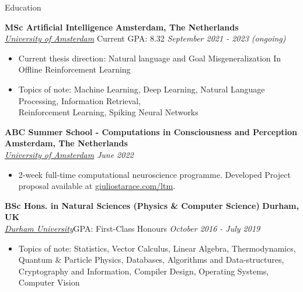 \documentclass{resume} %
\begin{document}
\begin{rSection}{Education}

	{\bf MSc Artificial Intelligence} \hfill \textbf{Amsterdam, The Netherlands}
	\\\href{https://www.dur.ac.uk/}{\textit{University of Amsterdam}} \hfill Current GPA: 8.32 \hfill {\em September 2021
		- 2023 (ongoing)}
	\begin{itemize}
		\item Current thesis direction: Natural language and Goal Misgeneralization In Offline
		      Reinforcement Learning
		\item Topics of note: Machine Learning, Deep Learning, Natural Language Processing, Information
		      Retrieval,\\ Reinforcement Learning, Spiking Neural Networks
	\end{itemize}

	{\bf ABC Summer School - Computations in Consciousness and Perception} \hfill \textbf{Amsterdam, The Netherlands}
	\\\href{https://www.dur.ac.uk/}{\textit{University of Amsterdam}} \hfill {\em June 2022}
	\begin{itemize}
		\item 2-week full-time computational neuroscience programme. Developed Project proposal
		      available at \href{https://www.giuliostarace.com/ltm/}{giuliostarace.com/ltm}.
	\end{itemize}

	{\bf BSc Hons. in Natural Sciences (Physics \& Computer Science)} \hfill \textbf{Durham, UK}
	\\\href{https://www.dur.ac.uk/}{\textit{Durham University}}\hfill GPA: First-Class Honours \hfill {\em October 2016 - July 2019}
	\begin{itemize}\vspace{-0.5em}
		\item Topics of note: Statistics, Vector Calculus, Linear Algebra, Thermodynamics, Quantum \&
		      Particle Physics, Databases, Algorithms and Data-structures, Cryptography and Information,
		      Compiler Design, Operating Systems, Computer Vision
	\end{itemize}
\end{rSection}
\end{document}
